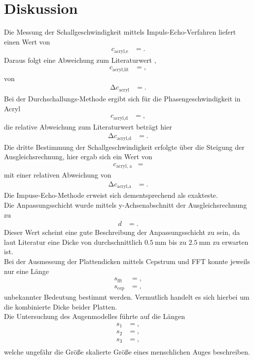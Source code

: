 \section{Diskussion}
\label{sec:Diskussion}
Die Messung der Schallgeschwindigkeit mittels Impuls-Echo-Verfahren liefert einen Wert von
\begin{align*}
  c_{\text{acryl,e}} &= .
\end{align*}
Daraus folgt eine Abweichung zum Literaturwert \cite{acryl},
\begin{align*}
  c_{\text{acryl,lit}} &= ,
\end{align*}
von
\begin{align*}
  \increment c_{\text{acryl}} &= .
\end{align*}
Bei der Durchschallungs-Methode ergibt sich für die Phasengeschwindigkeit in Acryl
\begin{align*}
  c_{\text{acryl,d}} &= ,
\end{align*}
die relative Abweichung zum Literaturwert beträgt hier
\begin{align*}
  \increment c_{\text{acryl,d}} &= .
\end{align*}
Die dritte Bestimmung der Schallgeschwindigkeit erfolgte über die Steigung der Ausgleichsrechnung, hier ergab sich ein Wert von
\begin{align*}
  c_{\text{acryl, a}} &= 
\end{align*}
mit einer relativen Abweichung von
\begin{align*}
  \increment c_{\text{acryl,a}} &= .
\end{align*}
Die Impuse-Echo-Methode erweist sich dementsprechend als exakteste.\\
Die Anpassungsschicht wurde mittels y-Achsenabschnitt der Ausgleichsrechnung zu
\begin{align*}
  d &= .
\end{align*}
Dieser Wert scheint eine gute Beschreibung der Anpassungsschicht zu sein, da laut Literatur eine Dicke von durchschnittlich $\SI{0.5}{\milli\metre}$ bis zu $\SI{2.5}{\milli\metre}$ zu erwarten ist. \cite{anpassungsschicht}\\
Bei der Ausmessung der Plattendicken mittels Cepstrum und FFT konnte jeweils nur eine Länge
\begin{align*}
  s_\text{fft} &= , \\
  s_\text{cep} &= ,
\end{align*}
unbekannter Bedeutung bestimmt werden.
Vermutlich handelt es sich hierbei um die kombinierte Dicke beider Platten.\\
Die Untersuchung des Augenmodelles führte auf die Längen
\begin{align*}
  s_{1} &= , \\
  s_{2} &= , \\
  s_{3} &= , \\
\end{align*}
welche ungefähr die Größe skalierte Größe eines menschlichen Auges beschreiben.
